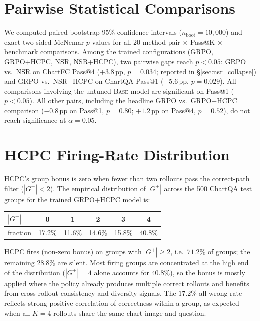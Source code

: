 \documentclass[11pt]{article}
\begin{document}
\section{Pairwise Statistical Comparisons}
\label{sec:pairwise}

We computed paired-bootstrap 95\% confidence intervals
($n_{\text{boot}}{=}10{,}000$) and exact two-sided McNemar
$p$-values for all 20 method-pair $\times$ Pass@K $\times$ benchmark
comparisons. Among the trained configurations
(\textsc{GRPO}, \textsc{GRPO+HCPC}, \textsc{NSR}, \textsc{NSR+HCPC}),
two pairwise gaps reach $p < 0.05$:
\textsc{GRPO} vs.\ \textsc{NSR} on ChartFC Pass@4
($+3.8$\,pp, $p{=}0.034$; reported in \S\ref{sec:nsr_collapse}) and
\textsc{GRPO} vs.\ \textsc{NSR+HCPC} on ChartQA Pass@1
($+5.6$\,pp, $p{=}0.029$). All comparisons involving the untuned
\textsc{Base} model are significant on Pass@1 ($p<0.05$). All other
pairs, including the headline \textsc{GRPO} vs.\ \textsc{GRPO+HCPC}
comparison ($-0.8$\,pp on Pass@1, $p{=}0.80$; $+1.2$\,pp on Pass@4,
$p{=}0.52$), do not reach significance at $\alpha{=}0.05$.

\section{HCPC Firing-Rate Distribution}
\label{sec:firing}

HCPC's group bonus is zero when fewer than two rollouts pass the
correct-path filter ($|G^+|<2$). The empirical distribution of
$|G^+|$ across the 500 ChartQA test groups for the trained
\textsc{GRPO+HCPC} model is:

\begin{center}
\footnotesize
\begin{tabular}{lccccc}
\toprule
$|G^+|$  & 0 & 1 & 2 & 3 & 4 \\
\midrule
fraction & 17.2\% & 11.6\% & 14.6\% & 15.8\% & 40.8\% \\
\bottomrule
\end{tabular}
\end{center}

HCPC fires (non-zero bonus) on groups with $|G^+|{\ge}2$, i.e.\
$71.2\%$ of groups; the remaining $28.8\%$ are silent. Most firing
groups are concentrated at the high end of the distribution
($|G^+|{=}4$ alone accounts for $40.8\%$), so the bonus is mostly
applied where the policy already produces multiple correct
rollouts and benefits from cross-rollout consistency and diversity
signals. The $17.2\%$ all-wrong rate reflects strong positive
correlation of correctness within a group, as expected when all
$K{=}4$ rollouts share the same chart image and question.
\end{document}
